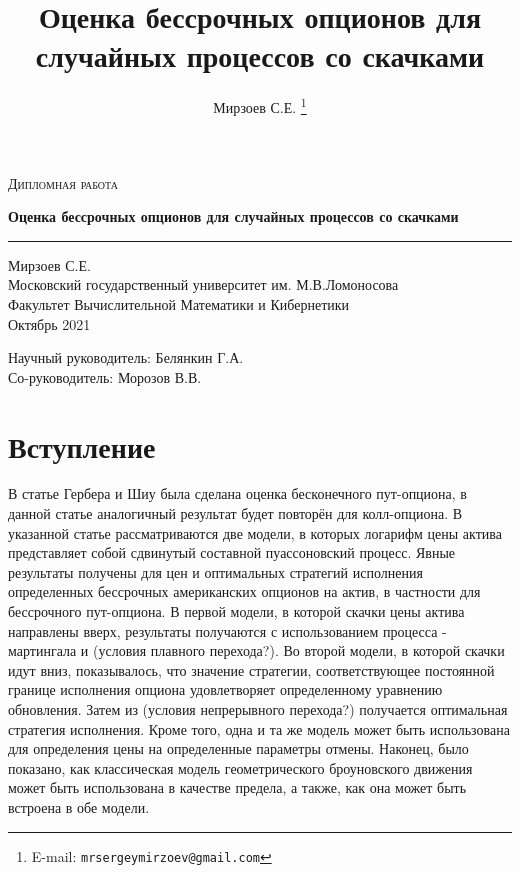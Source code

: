 \documentclass[a4paper,12pt]{article}
\author{Мирзоев С.Е.%
\thanks{E-mail: \texttt{mrsergeymirzoev@gmail.com}}}
\title{Оценка бессрочных опционов для случайных процессов со скачками}
\affil{Факультет Вычислительной Математики и Кибернетики, Московский государственный университет им. М.В.Ломоносова}
\theoremstyle{definition}
\begin{document}
\begin{titlepage}
\centering

\textsc{Дипломная работа}


{\LARGE\bfseries Оценка бессрочных опционов для случайных процессов со скачками\\}
\rule{3in}{0.4pt}


Мирзоев С.Е.\\
Московский государственный университет им. М.В.Ломоносова\\
Факультет Вычислительной Математики и Кибернетики\\
Октябрь 2021


{\small
Научный руководитель: Белянкин Г.А.\\
Со-руководитель: Морозов В.В.}


\end{titlepage}
\thispagestyle{empty}

\newpage
\tableofcontents

\newpage

\section{Вступление}

В статье Гербера и Шиу была сделана оценка бесконечного пут-опциона, в данной статье аналогичный результат будет повторён для колл-опциона. В указанной статье рассматриваются две модели, в которых логарифм цены актива представляет собой сдвинутый составной пуассоновский процесс. Явные результаты получены для цен и оптимальных стратегий исполнения определенных бессрочных американских опционов на актив, в частности для бессрочного пут-опциона. В первой модели, в которой скачки цены актива направлены вверх, результаты получаются с использованием процесса - мартингала и (условия плавного перехода?). Во второй модели, в которой скачки идут вниз, показывалось, что значение стратегии, соответствующее постоянной границе исполнения опциона удовлетворяет определенному уравнению обновления. Затем из (условия непрерывного перехода?) получается оптимальная стратегия исполнения. Кроме того, одна и та же модель может быть использована для определения цены на определенные параметры отмены. Наконец, было показано, как классическая модель геометрического броуновского движения может быть использована в качестве предела, а также, как она может быть встроена в обе модели.
\end{document}
